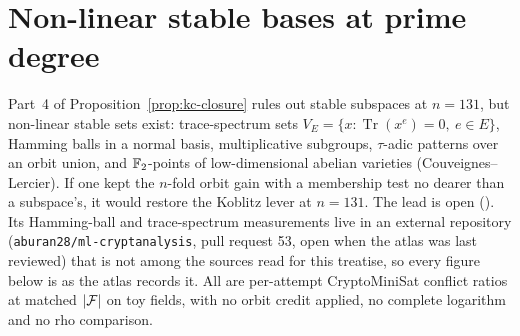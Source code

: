 \section{Non-linear stable bases at prime degree}\label{sec:kc-nonlinear}

Part~4 of Proposition~\ref{prop:kc-closure} rules out stable subspaces at
$n=131$, but non-linear stable sets exist: trace-spectrum sets
$V_E=\{x:\operatorname{Tr}(x^e)=0,\ e\in E\}$, Hamming balls in a normal
basis, multiplicative subgroups, $\tau$-adic patterns over an orbit union,
and $\mathbb{F}_2$-points of low-dimensional abelian varieties
(Couveignes--Lercier). If one kept the $n$-fold orbit gain with a membership
test no dearer than a subspace's, it would restore the Koblitz lever at
$n=131$. The lead is open
().
Its Hamming-ball and trace-spectrum measurements live in an external
repository (\texttt{aburan28/ml-cryptanalysis}, pull request 53, open when
the atlas was last reviewed) that is not among the sources read for this
treatise, so every figure below is as the atlas records it. All are
per-attempt CryptoMiniSat conflict ratios at matched $\lvert \mathcal{F} \rvert$ on toy
fields, with no orbit credit applied, no complete logarithm and no rho
comparison.

